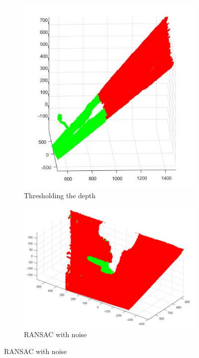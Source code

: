 \documentclass[letterpaper, 10 pt, conference]{ieeeconf}  %
\begin{document}
\begin{figure}
\centering
\begin{subfigure}{.3\textwidth}
  \centering
  \includegraphics[scale=0.3]{thresholding.jpg}
  \caption{Thresholding the depth}
  \label{fig:thresh}
\end{subfigure}%
\begin{subfigure}{.3\textwidth}
  \centering
  \includegraphics[scale=0.3]{ransac2.jpg}
  \caption{RANSAC with noise}
  \label{fig:ransac}
\end{subfigure}

\end{figure}
\end{document}
